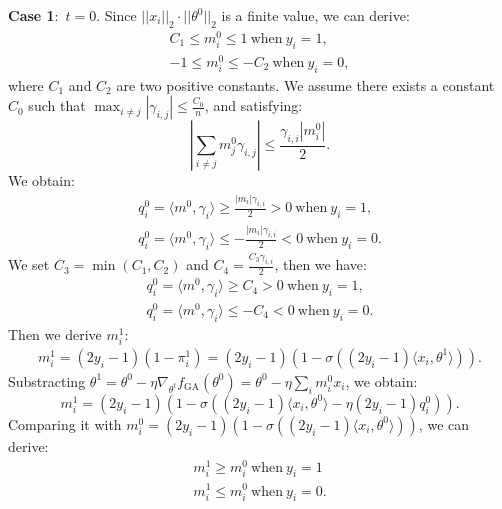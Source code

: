 \documentclass{article}
\theoremstyle{plain}
\theoremstyle{definition}
\theoremstyle{remark}
\begin{document}
\textbf{Case 1}:~$t=0$. Since $||x_i||_2\cdot||\theta^0||_2$ is a finite value, we can derive:
\begin{equation}
    \begin{aligned}
        C_1\leq m_i^0\leq1~\text{when}~y_i=1,\\
        -1\leq m_i^0\leq-C_2~\text{when}~y_i=0,
    \end{aligned}
\end{equation}
where $C_1$ and $C_2$ are two positive constants. We assume there exists a constant $C_0$ such that $\max_{i\neq j}|\gamma_{i,j}|\leq \frac{C_0}{n}$, and satisfying:
\begin{equation}
    \left|\sum_{i\neq j}m_j^0\gamma_{i,j}\right|\leq\frac{\gamma_{i,i}|m_i^0|}{2}.
\end{equation}
We obtain:
\begin{equation}
\begin{aligned}
    q_i^0=\langle m^0, \gamma_i\rangle\geq \frac{|m_i|\gamma_{i,i}}{2}>0~\text{when}~y_i=1,\\
    q_i^0=\langle m^0, \gamma_i\rangle\leq -\frac{|m_i|\gamma_{i,i}}{2}<0~\text{when}~y_i=0.
\end{aligned}
\end{equation}
We set $C_3=\min(C_1,C_2)$ and $C_4=\frac{C_3\gamma_{i,i}}{2}$, then we have:
\begin{equation}
\begin{aligned}
    q_i^0=\langle m^0, \gamma_i\rangle\geq C_4>0~\text{when}~y_i=1,\\
    q_i^0=\langle m^0, \gamma_i\rangle\leq -C_4<0~\text{when}~y_i=0.
\end{aligned}
\end{equation}
Then we derive $m^1_i$:
\begin{equation}
\begin{aligned}
    m^1_i=(2y_i-1)(1-\pi_i^1)=(2y_i-1)(1-\sigma((2y_i-1)\langle x_i,\theta^1\rangle)).
\end{aligned}
\end{equation}
Substracting $\theta^1=\theta^0-\eta\nabla_{\theta^t}f_{\text{GA}}(\theta^0)=\theta^0-\eta\sum_i m_i^0x_i$, we obtain:
\begin{equation}
    m_i^1=(2y_i-1)\left(1-\sigma\left((2y_i-1)\langle x_i,\theta^0\rangle-\eta(2y_i-1)q_i^0\right)\right).
\end{equation}
Comparing it with $m_i^0=(2y_i-1)(1-\sigma((2y_i-1)\langle x_i,\theta^0\rangle))$, we can derive:
\begin{equation}
\begin{aligned}
    m_i^1\geq m_i^0~\text{when}~y_i=1\\
    m_i^1\leq m_i^0~\text{when}~y_i=0.
\end{aligned}
\end{equation}
\end{document}
